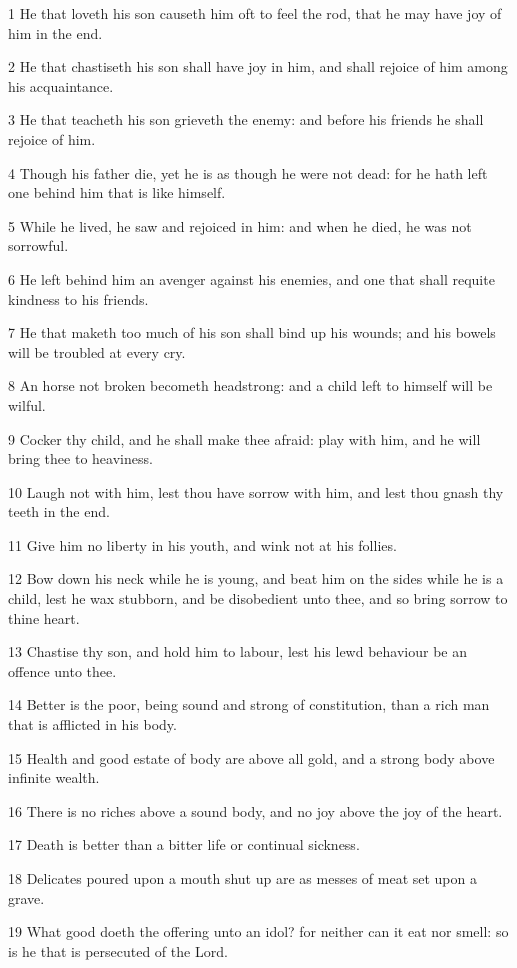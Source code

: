 \par 1 He that loveth his son causeth him oft to feel the rod, that he may have joy of him in the end.
\par 2 He that chastiseth his son shall have joy in him, and shall rejoice of him among his acquaintance.
\par 3 He that teacheth his son grieveth the enemy: and before his friends he shall rejoice of him.
\par 4 Though his father die, yet he is as though he were not dead: for he hath left one behind him that is like himself.
\par 5 While he lived, he saw and rejoiced in him: and when he died, he was not sorrowful.
\par 6 He left behind him an avenger against his enemies, and one that shall requite kindness to his friends.
\par 7 He that maketh too much of his son shall bind up his wounds; and his bowels will be troubled at every cry.
\par 8 An horse not broken becometh headstrong: and a child left to himself will be wilful.
\par 9 Cocker thy child, and he shall make thee afraid: play with him, and he will bring thee to heaviness.
\par 10 Laugh not with him, lest thou have sorrow with him, and lest thou gnash thy teeth in the end.
\par 11 Give him no liberty in his youth, and wink not at his follies.
\par 12 Bow down his neck while he is young, and beat him on the sides while he is a child, lest he wax stubborn, and be disobedient unto thee, and so bring sorrow to thine heart.
\par 13 Chastise thy son, and hold him to labour, lest his lewd behaviour be an offence unto thee.
\par 14 Better is the poor, being sound and strong of constitution, than a rich man that is afflicted in his body.
\par 15 Health and good estate of body are above all gold, and a strong body above infinite wealth.
\par 16 There is no riches above a sound body, and no joy above the joy of the heart.
\par 17 Death is better than a bitter life or continual sickness.
\par 18 Delicates poured upon a mouth shut up are as messes of meat set upon a grave.
\par 19 What good doeth the offering unto an idol? for neither can it eat nor smell: so is he that is persecuted of the Lord.
